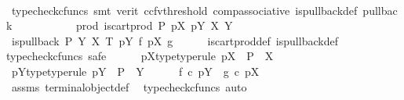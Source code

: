 \begin{isabellebody}
\ \ \ \ \ \ \ \ \isamarkupfalse%
\ {\isacharparenleft}{\kern0pt}typecheck{\isacharunderscore}{\kern0pt}cfuncs{\isacharcomma}{\kern0pt}\ smt\ {\isacharparenleft}{\kern0pt}verit{\isacharcomma}{\kern0pt}\ ccfv{\isacharunderscore}{\kern0pt}threshold{\isacharparenright}{\kern0pt}\ comp{\isacharunderscore}{\kern0pt}associative{}\ is{\isacharunderscore}{\kern0pt}pullback{\isacharunderscore}{\kern0pt}def\ pullback{\isacharparenright}{\kern0pt}\isanewline
\ \ \ \ \isamarkupfalse%
\isanewline
\ \ \isamarkupfalse%
\isanewline
{}\isamarkupfalse%
\isanewline
\ \ \isamarkupfalse%
\ prod{\isacharcolon}{\kern0pt}\ {\isachardoublequoteopen}is{\isacharunderscore}{\kern0pt}cart{\isacharunderscore}{\kern0pt}prod\ P\ pX\ pY\ X\ Y{\isachardoublequoteclose}\isanewline
\ \ \isamarkupfalse%
\ \isamarkupfalse%
\ {\isachardoublequoteopen}is{\isacharunderscore}{\kern0pt}pullback\ P\ Y\ X\ T\ pY\ f\ pX\ g{\isachardoublequoteclose}\isanewline
\ \ \ \ \isamarkupfalse%
\ is{\isacharunderscore}{\kern0pt}cart{\isacharunderscore}{\kern0pt}prod{\isacharunderscore}{\kern0pt}def\ is{\isacharunderscore}{\kern0pt}pullback{\isacharunderscore}{\kern0pt}def\isanewline
\ \ \isamarkupfalse%
{\isacharparenleft}{\kern0pt}typecheck{\isacharunderscore}{\kern0pt}cfuncs{\isacharcomma}{\kern0pt}\ safe{\isacharparenright}{\kern0pt}\isanewline
\ \ \ \ \isamarkupfalse%
\ pX{\isacharunderscore}{\kern0pt}type{\isacharbrackleft}{\kern0pt}type{\isacharunderscore}{\kern0pt}rule{\isacharbrackright}{\kern0pt}{\isacharcolon}{\kern0pt}\ {\isachardoublequoteopen}pX\ {\isacharcolon}{\kern0pt}\ P\ {\isasymrightarrow}\ X{\isachardoublequoteclose}\isanewline
\ \ \ \ \isamarkupfalse%
\ pY{\isacharunderscore}{\kern0pt}type{\isacharbrackleft}{\kern0pt}type{\isacharunderscore}{\kern0pt}rule{\isacharbrackright}{\kern0pt}{\isacharcolon}{\kern0pt}\ {\isachardoublequoteopen}pY\ {\isacharcolon}{\kern0pt}\ P\ {\isasymrightarrow}\ Y{\isachardoublequoteclose}\isanewline
\ \ \ \ \isamarkupfalse%
\ {\isachardoublequoteopen}f\ {\isasymcirc}\isactrlsub c\ pY\ {\isacharequal}{\kern0pt}\ g\ {\isasymcirc}\isactrlsub c\ pX{\isachardoublequoteclose}\isanewline
\ \ \ \ \ \ \isamarkupfalse%
\ assms{\isacharparenleft}{\kern0pt}{}{\isacharparenright}{\kern0pt}\ terminal{\isacharunderscore}{\kern0pt}object{\isacharunderscore}{\kern0pt}def\ \isamarkupfalse%
\ {\isacharparenleft}{\kern0pt}typecheck{\isacharunderscore}{\kern0pt}cfuncs{\isacharcomma}{\kern0pt}\ auto{\isacharparenright}{\kern0pt}\ \ \isanewline

\end{isabellebody}
